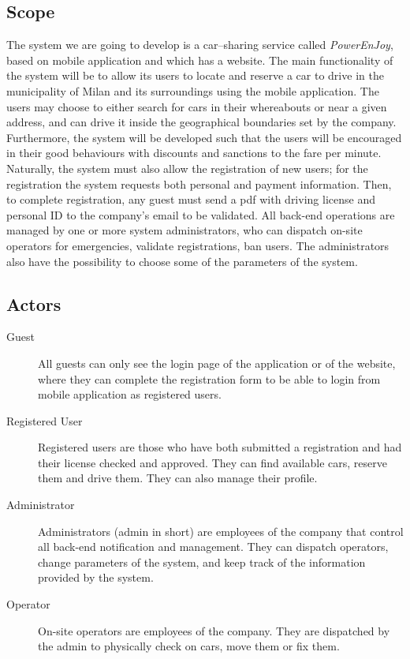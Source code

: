 \documentclass{article}
\begin{document}
		\subsection{Scope}
			The system we are going to develop is a car–sharing service called \textit{PowerEnJoy}, based on mobile application and which has a website. 
			The main functionality of the system will be to allow its users to locate and reserve a car to drive in the municipality of Milan and its surroundings using the mobile application. The users may choose to either search for cars in their whereabouts or near a given address, and can drive it inside the geographical boundaries set by the company. 
			Furthermore, the system will be developed such that the users will be encouraged in their good behaviours with discounts and sanctions to the fare per minute.
			Naturally, the system must also allow the registration of new users; for the registration the system requests both personal and payment information. Then, to complete registration, any guest must send a pdf with driving license and personal ID to the company's email to be validated. 
			All back-end operations are managed by one or more system administrators, who can dispatch on-site operators for emergencies, validate registrations, ban users. The administrators also have the possibility to choose some of the parameters of the system. 
			
			
		
		\subsection{Actors}
		
		\begin{description}
			\item[Guest] All guests can only see the login page of the application or of the website, where they can complete the registration form to be able to login from mobile application as registered users.
			
			\item[Registered User] Registered users are those who have both submitted a registration and had their license checked and approved. They can find available cars, reserve them and drive them. They can also manage their profile. 
			
			\item[Administrator] Administrators (admin in short) are employees of the company that control all back-end notification and management. They can dispatch operators, change parameters of the system, and keep track of the information provided by the system. %
			
			\item[Operator] On-site operators are employees of the company. They are dispatched by the admin to physically check on cars, move them or fix them.
		\end{description}  	
\end{document}

